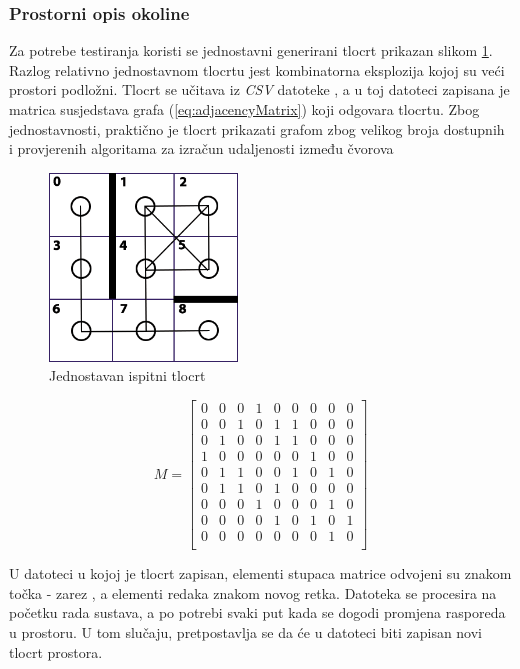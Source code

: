 \documentclass[times, utf8, diplomski, numeric]{fer}
\begin{document}
\subsubsection{Prostorni opis okoline}
Za potrebe testiranja koristi se jednostavni generirani tlocrt prikazan slikom
\ref{fig:layout}. Razlog relativno jednostavnom tlocrtu jest kombinatorna
eksplozija kojoj su veći prostori podložni. Tlocrt se učitava iz \emph{CSV}
datoteke , a u toj datoteci zapisana je matrica
susjedstava grafa (\ref{eq:adjacencyMatrix}) koji odgovara tlocrtu. Zbog
jednostavnosti, praktično je tlocrt prikazati grafom zbog velikog broja
dostupnih i provjerenih algoritama za izračun udaljenosti između čvorova

\begin{figure}[!htb]
	\centering
	\includegraphics[width=5cm]{images/3x3grid.png}
	\caption{Jednostavan ispitni tlocrt}
	\label{fig:layout}
\end{figure}

\begin{equation}
	\label{eq:adjacencyMatrix}
	M = 
	\begin{bmatrix}
		0 & 0 & 0 & 1 & 0 & 0 & 0 & 0 & 0\\
		0 & 0 & 1 & 0 & 1 & 1 & 0 & 0 & 0\\
		0 & 1 & 0 & 0 & 1 & 1 & 0 & 0 & 0\\
		1 & 0 & 0 & 0 & 0 & 0 & 1 & 0 & 0\\
		0 & 1 & 1 & 0 & 0 & 1 & 0 & 1 & 0\\
		0 & 1 & 1 & 0 & 1 & 0 & 0 & 0 & 0\\
		0 & 0 & 0 & 1 & 0 & 0 & 0 & 1 & 0\\
		0 & 0 & 0 & 0 & 1 & 0 & 1 & 0 & 1\\
		0 & 0 & 0 & 0 & 0 & 0 & 0 & 1 & 0\\
	\end{bmatrix}
\end{equation}

U datoteci u kojoj je tlocrt zapisan, elementi stupaca matrice odvojeni su
znakom točka - zarez , a elementi redaka znakom novog retka.
Datoteka se procesira na početku rada sustava, a po potrebi svaki put kada se
dogodi promjena rasporeda u prostoru. U tom slučaju, pretpostavlja se da će u
datoteci biti zapisan novi tlocrt prostora.
\end{document}
